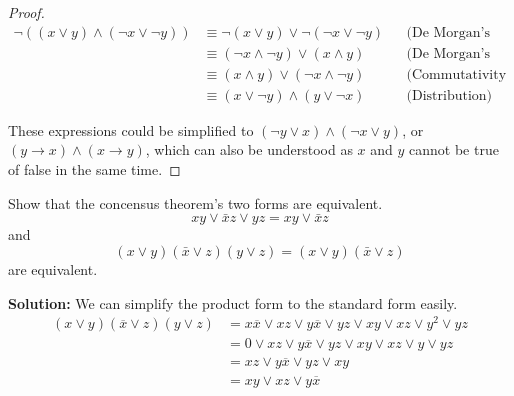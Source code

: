\begin{proof}
                        \begin{align*}
                            \neg((x \lor y) \land (\neg x \lor \neg y)) & \equiv \neg(x \lor y) \lor \neg(\neg x \lor \neg y) && \text{(De Morgan's laws)} \\
                            & \equiv (\neg x \land \neg y) \lor (x \land y) && \text{(De Morgan's laws)} \\
                            & \equiv (x \land y) \lor (\neg x \land \neg y) && \text{(Commutativity of OR)} \\
                            & \equiv (x \lor \neg y) \land (y \lor \neg x) && \text{(Distribution)}
                            \end{align*}
                            

            These expressions could be simplified to $(\lnot y \lor x)\land(\lnot x\lor y)$, or
            $(y\rightarrow x)\land(x\rightarrow y)$, which can also be understood as $x$ and $y$
            cannot be true of false in the same time.
        \end{proof}

        \begin{exercise}
            Show that the concensus theorem's two forms are equivalent.
                $$xy\lor\bar{x}z\lor yz=xy\lor\bar{x}z$$
            and
                $$(x\lor y)(\bar{x}\lor z)(y\lor z)=(x\lor y)(\bar{x}\lor z)$$
            are equivalent.
        \end{exercise}
        \textbf{Solution:}
        We can simplify the product form to the standard form easily.
        \begin{align*}
            (x \lor y)(\overline{x} \lor z)(y \lor z) &= x\overline{x} \lor xz \lor y\overline{x} \lor yz \lor xy \lor xz \lor y^2 \lor yz \\
            &= 0 \lor xz \lor y\overline{x} \lor yz \lor xy \lor xz \lor y \lor yz \\
            &= xz \lor y\overline{x} \lor yz \lor xy \\
            &= xy \lor xz \lor y\overline{x}
        \end{align*}


